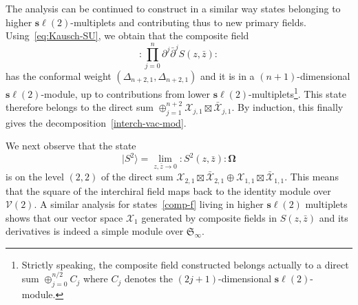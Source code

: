 \documentclass[11pt]{article}
\newcommand{\vac}{\boldsymbol{\Omega}}
\newcommand{\VirN}{\boldsymbol{\mathcal{V}}}
\newcommand{\interLie}{\mathfrak{S}}
\newcommand{\interinfin}{\interLie_{\infty}}
\newcommand{\interM}[1]{\mathscr{X}_{#1}}
\newcommand{\nSU}{\boldsymbol{s\ell}}
\newcommand{\SUrep}[1]{C_{#1}}
\newcommand{\bz}{\bar{z}}
\newcommand{\der}{\partial}
\newcommand{\enrg}{S}
\newcommand{\VX}{\mathcal{X}}
\newcommand{\nord}[1]{\boldsymbol{\colon}\!\!{#1}\boldsymbol{\colon}\!\!}
\theoremstyle{definition}
\begin{document}
 The analysis can be continued to construct in a similar way states belonging to higher $\nSU(2)$-multiplets and contributing thus to new primary fields. Using~\eqref{eq:Kausch-SU}, we obtain that the composite field
 \begin{equation}\label{comp-f}
 \nord{\prod_{j=0}^n\der^j\bar{\der}^j\enrg(z,\bz)}
 \end{equation}
  has the conformal weight $(\Delta_{n+2,1},\Delta_{n+2,1})$ and  it is in a $(n+1)$-dimensional $\nSU(2)$-module, up to contributions from lower $\nSU(2)$-multiplets\footnote{Strictly speaking, the composite field constructed belongs actually to a direct sum $\oplus_{j=0}^{n/2}\SUrep{j}$ where $\SUrep{j}$ denotes the $(2j+1)$-dimensional $\nSU(2)$-module.}. This state therefore belongs  to the direct sum $\oplus_{j=1}^{n+2} \VX_{j,1}\boxtimes\bar{\VX}_{j,1}$. By induction, this finally gives the decomposition~\eqref{interch-vac-mod}.


We next observe that the state
\begin{equation*}
|S^2\rangle = \lim_{z,\bz\to0}\nord{\enrg^2(z,\bz)}\vac
\end{equation*}
 is on the level $(2,2)$ of the direct sum $\VX_{2,1}\boxtimes\bar{\VX}_{2,1}\oplus \VX_{1,1}\boxtimes\bar{\VX}_{1,1}$. This means that the square of the interchiral field maps back to the identity module over $\VirN(2)$. A similar analysis for states~\eqref{comp-f} living in higher $\nSU(2)$ multiplets shows that our vector space $\interM{1}$ generated by composite fields in $\enrg(z,\bz)$ and its derivatives is indeed a simple module over $\interinfin$.
\end{document}
